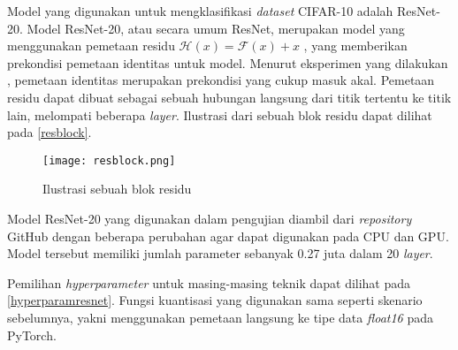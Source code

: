Model yang digunakan untuk mengklasifikasi \emph{dataset} CIFAR-10 adalah ResNet-20. Model ResNet-20, atau secara umum ResNet, merupakan model yang menggunakan pemetaan residu $\mathcal{H}(x) = \mathcal{F}(x) + x$ \parencite{he2015deep}, yang memberikan prekondisi pemetaan identitas untuk model. Menurut eksperimen yang dilakukan \textcite{he2015deep}, pemetaan identitas merupakan prekondisi yang cukup masuk akal. Pemetaan residu dapat dibuat sebagai sebuah hubungan langsung dari titik tertentu ke titik lain, melompati beberapa \emph{layer}. Ilustrasi dari sebuah blok residu dapat dilihat pada \autoref{resblock}.

\begin{figure}[htb]
  \centering
  \texttt{[image: resblock.png]}
  \caption{Ilustrasi sebuah blok residu \parencite{he2015deep}}\label{resblock}
\end{figure}

Model ResNet-20 yang digunakan dalam pengujian diambil dari \emph{repository} GitHub \cite{Idelbayev18a} dengan beberapa perubahan agar dapat digunakan pada CPU dan GPU. Model tersebut memiliki jumlah parameter sebanyak 0.27 juta dalam 20 \emph{layer}.

Pemilihan \emph{hyperparameter} untuk masing-masing teknik dapat dilihat pada \autoref{hyperparamresnet}. Fungsi kuantisasi yang digunakan sama seperti skenario sebelumnya, yakni menggunakan pemetaan langsung ke tipe data \emph{float16} pada PyTorch.

